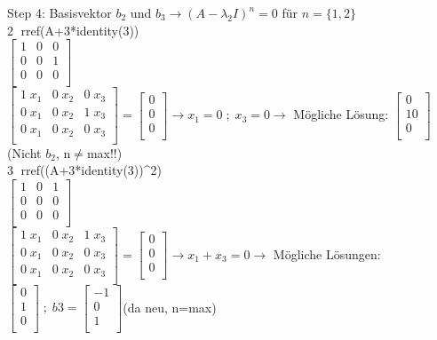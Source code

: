 Step 4: Basisvektor $b_2$ und $b_3 \rightarrow (A- \lambda_2 I)^n = 0$ für $n=\{1,2\}$\\
\textcircled{2} rref(A+3*identity(3))\\
\hspace*{2cm}$\begin{bmatrix}
	1 & 0 & 0\\
	0 & 0 & 1\\
	0 & 0 & 0\\
\end{bmatrix}$\\

$\begin{bmatrix}
	1\;x_1 & 0\;x_2 & 0\;x_3\\
	0\;x_1 & 0\;x_2 & 1\;x_3\\
	0\;x_1 & 0\;x_2 & 0\;x_3\\
\end{bmatrix} = \begin{bmatrix}
	0\\
	0\\
	0\\
\end{bmatrix} \rightarrow x_1=0 \; ; \; x_3=0 \rightarrow$ Mögliche Lösung: $\begin{bmatrix}
	0\\
	10\\
	0\\
\end{bmatrix}$ (Nicht $b_2$, n$\neq$max!!)\\

\textcircled{3} rref((A+3*identity(3))\textasciicircum2)\\
\hspace*{2cm}$\begin{bmatrix}
	1 & 0 & 1\\
	0 & 0 & 0\\
	0 & 0 & 0\\
\end{bmatrix}$\\

$\begin{bmatrix}
	1\;x_1 & 0\;x_2 & 1\;x_3\\
	0\;x_1 & 0\;x_2 & 0\;x_3\\
	0\;x_1 & 0\;x_2 & 0\;x_3\\
\end{bmatrix} = \begin{bmatrix}
	0\\
	0\\
	0\\
\end{bmatrix} \rightarrow x_1 + x_3=0 \rightarrow$ Mögliche Lösungen: $\begin{bmatrix}
	0\\
	1\\
	0\\
\end{bmatrix} \; ; \; b3 = \begin{bmatrix}
	-1\\
	0\\
	1\\
\end{bmatrix}$(da neu, n=max)\\

